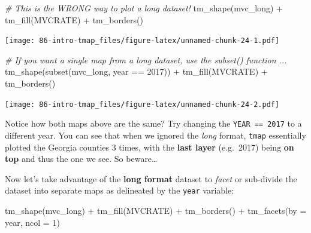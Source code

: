 \documentclass[
]{book}
\newenvironment{Shaded}{\begin{snugshade}}{\end{snugshade}}
\newcommand{\AttributeTok}[1]{\textcolor[rgb]{0.77,0.63,0.00}{#1}}
\newcommand{\CommentTok}[1]{\textcolor[rgb]{0.56,0.35,0.01}{\textit{#1}}}
\newcommand{\DecValTok}[1]{\textcolor[rgb]{0.00,0.00,0.81}{#1}}
\newcommand{\FunctionTok}[1]{\textcolor[rgb]{0.00,0.00,0.00}{#1}}
\newcommand{\NormalTok}[1]{#1}
\newcommand{\SpecialCharTok}[1]{\textcolor[rgb]{0.00,0.00,0.00}{#1}}
\newcommand{\StringTok}[1]{\textcolor[rgb]{0.31,0.60,0.02}{#1}}
\begin{document}
\begin{Shaded}
\begin{Highlighting}[]
\CommentTok{\# This is the WRONG way to plot a long dataset!}
\FunctionTok{tm\_shape}\NormalTok{(mvc\_long) }\SpecialCharTok{+}
  \FunctionTok{tm\_fill}\NormalTok{(}\StringTok{\textquotesingle{}MVCRATE\textquotesingle{}}\NormalTok{) }\SpecialCharTok{+}
  \FunctionTok{tm\_borders}\NormalTok{()}
\end{Highlighting}
\end{Shaded}

\texttt{[image: 86-intro-tmap\_files/figure-latex/unnamed-chunk-24-1.pdf]}

\begin{Shaded}
\begin{Highlighting}[]
\CommentTok{\# If you want a single map from a long dataset, use the subset() function ...}
\FunctionTok{tm\_shape}\NormalTok{(}\FunctionTok{subset}\NormalTok{(mvc\_long, year }\SpecialCharTok{==} \DecValTok{2017}\NormalTok{)) }\SpecialCharTok{+}
  \FunctionTok{tm\_fill}\NormalTok{(}\StringTok{\textquotesingle{}MVCRATE\textquotesingle{}}\NormalTok{) }\SpecialCharTok{+}
  \FunctionTok{tm\_borders}\NormalTok{()}
\end{Highlighting}
\end{Shaded}

\texttt{[image: 86-intro-tmap\_files/figure-latex/unnamed-chunk-24-2.pdf]}

Notice how both maps above are the same? Try changing the \texttt{YEAR\ ==\ 2017} to a different year. You can see that when we ignored the \emph{long} format, \texttt{tmap} essentially plotted the Georgia counties 3 times, with the \textbf{last layer} (e.g.~2017) being \textbf{on top} and thus the one we see. So beware\ldots{}

Now let's take advantage of the \textbf{long format} dataset to \emph{facet} or sub-divide the dataset into separate maps as delineated by the \texttt{year} variable:

\begin{Shaded}
\begin{Highlighting}[]
\FunctionTok{tm\_shape}\NormalTok{(mvc\_long) }\SpecialCharTok{+}
  \FunctionTok{tm\_fill}\NormalTok{(}\StringTok{\textquotesingle{}MVCRATE\textquotesingle{}}\NormalTok{) }\SpecialCharTok{+} 
  \FunctionTok{tm\_borders}\NormalTok{() }\SpecialCharTok{+}
\FunctionTok{tm\_facets}\NormalTok{(}\AttributeTok{by =} \StringTok{\textquotesingle{}year\textquotesingle{}}\NormalTok{, }\AttributeTok{ncol =} \DecValTok{1}\NormalTok{)}
\end{Highlighting}
\end{Shaded}
\end{document}
